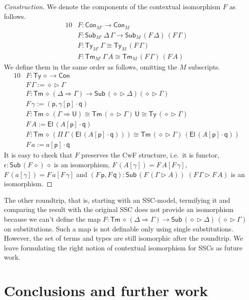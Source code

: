 \documentclass[sigplan,10pt,anonymous,review]{acmart}\settopmatter{printfolios=true,printccs=false,printacmref=false}
\newcommand{\ra}{\rightarrow}
\newcommand{\Ra}{\Rightarrow}
\newcommand{\Ty}{\mathsf{Ty}}
\newcommand{\Tm}{\mathsf{Tm}}
\newcommand{\Con}{\mathsf{Con}}
\newcommand{\Sub}{\mathsf{Sub}}
\newcommand{\p}{\mathsf{p}}
\newcommand{\q}{\mathsf{q}}
\newcommand{\ext}{\mathop{\triangleright}}
\newcommand{\U}{\mathsf{U}}
\newcommand{\El}{\mathsf{El}}
\begin{document}
\begin{proof}[Construction]
  We denote the components of the contextual isomorphism $F$ as follows.
  \begin{alignat*}{10}
    & F : \Con_{M'}\ra\Con_M \\
    & F : \Sub_{M'}\,\Delta\,\Gamma\ra\Sub_M\,(F\,\Delta)\,(F\,\Gamma) \\
    & F : \Ty_{M'}\,\Gamma \cong \Ty_M\,(F\,\Gamma) \\
    & F : \Tm_{M'}\,\Gamma\,A \cong \Tm_M\,(F\,\Gamma)\,(F\,A)
  \end{alignat*}
  We define them in the same order as follows, omitting the $M$ subscripts.
  \begin{alignat*}{10}
    & F : \Ty\,\diamond\ra\Con \\
    & F\,\Gamma := \diamond\ext\Gamma \\
    & F : \Tm\,\diamond\,(\Delta\Ra\Gamma) \ra \Sub\,(\diamond\ext\Delta) (\diamond\ext\Gamma) \\
    & F\,\gamma := (\p,\gamma[\p]\cdot\q) \\
    & F : \Tm\,\diamond\,(\Gamma\Ra\U) \cong \Tm\,(\diamond\ext\Gamma)\,\U \cong \Ty\,(\diamond\ext\Gamma) \\
    & F\,A := \El\,(A[\p]\cdot\q) \\
    & F : \Tm\,\diamond\,(\Pi\,\Gamma\,(\El\,(A[\p]\cdot\q))) \cong \Tm\,(\diamond\ext\Gamma)\,(\El\,(A[\p]\cdot\q)) \\
    & F\,a := a[\p]\cdot\q
  \end{alignat*}
  It is easy to check that $F$ preserves the CwF structure, i.e.\ it
  is functor, $\epsilon : \Sub\,(F\,\diamond)\,\diamond$ is an
  isomorphism, $F\,(A[\gamma]) = F\,A[F\,\gamma]$, $F\,(a[\gamma]) =
  F\,a[F\,\gamma]$ and $(F\,\p,F\,\q) : \Sub\,(F\,(\Gamma\ext
  A))$ $(F\,\Gamma\ext F\,A)$ is an isomorphism. %
\end{proof}
The other roundtrip, that is, starting with an SSC-model, termifying
it and comparing the result with the original SSC does not provide an
isomorphism because we can't define the map $F :
\Tm\,\diamond\,(\Delta\Ra\Gamma) \ra
\Sub\,(\diamond\ext\Delta)\,(\diamond\ext\Gamma)$ on
substitutions. Such a map is not definable only using single
substitutions. However, the set of terms and types are still
isomorphic after the roundtrip. We leave formulating the right notion
of contextual isomorphism for SSCs as future work.

\section{Conclusions and further work}
\label{sec:conclusion}
\end{document}
